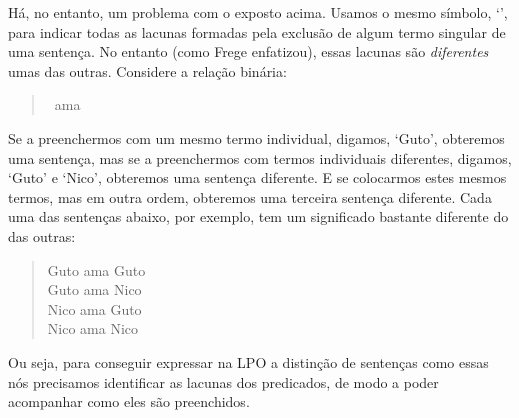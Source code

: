 Há, no entanto, um problema com o exposto acima.
Usamos o mesmo símbolo, `\blank', para indicar todas as lacunas formadas pela exclusão de algum termo singular de uma sentença.
No entanto (como Frege enfatizou), essas lacunas são \emph{diferentes} umas das outras.
Considere a relação binária:
\begin{quote}
	\blank\ ama \blank
\end{quote}
Se a preenchermos com um mesmo termo individual, digamos, `Guto', obteremos uma sentença, mas se a preenchermos com termos individuais diferentes, digamos, `Guto' e `Nico', obteremos uma sentença diferente.
E se colocarmos estes mesmos termos, mas em outra ordem, obteremos uma terceira sentença diferente.
Cada uma das sentenças abaixo, por exemplo, tem um significado bastante diferente do das outras:

	\begin{quote}
		Guto ama Guto\\
		Guto ama Nico\\
		Nico ama Guto\\
		Nico ama Nico
	\end{quote}
Ou seja, para conseguir expressar na LPO a distinção de sentenças como essas nós precisamos identificar as lacunas dos predicados, de modo a poder acompanhar como eles são preenchidos.

